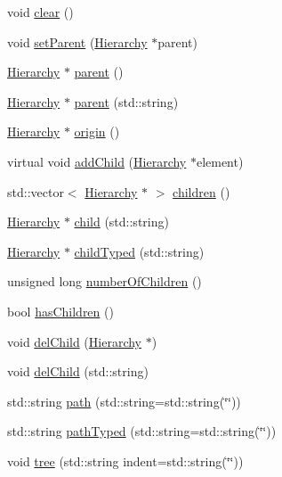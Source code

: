 \begin{DoxyCompactItemize}
void \hyperlink{classHierarchy_af4d43b0765b402670eed2d62c73405af}{clear} ()
\item 
void \hyperlink{classHierarchy_a585ad1aeec16077a0e532ab8b4fc557b}{setParent} (\hyperlink{classHierarchy}{Hierarchy} $\ast$parent)
\item 
\hyperlink{classHierarchy}{Hierarchy} $\ast$ \hyperlink{classHierarchy_a1c7bec8257e717f9c1465e06ebf845fc}{parent} ()
\item 
\hyperlink{classHierarchy}{Hierarchy} $\ast$ \hyperlink{classHierarchy_ad550588733bf75ac5c0fcfd7c8fd11a6}{parent} (std::string)
\item 
\hyperlink{classHierarchy}{Hierarchy} $\ast$ \hyperlink{classHierarchy_aee461dc930ce3871636ff87f075b1b83}{origin} ()
\item 
virtual void \hyperlink{classHierarchy_ad677774ff38fcb257c04a3a10d471fac}{addChild} (\hyperlink{classHierarchy}{Hierarchy} $\ast$element)
\item 
std::vector$<$ \hyperlink{classHierarchy}{Hierarchy} $\ast$ $>$ \hyperlink{classHierarchy_aa9a76f69e98e052ee1a6e32cea006288}{children} ()
\item 
\hyperlink{classHierarchy}{Hierarchy} $\ast$ \hyperlink{classHierarchy_a1e207f973c694b538bf90107b4868817}{child} (std::string)
\item 
\hyperlink{classHierarchy}{Hierarchy} $\ast$ \hyperlink{classHierarchy_a0c15a5276a3b80b4354d6bd8a01e0708}{childTyped} (std::string)
\item 
unsigned long \hyperlink{classHierarchy_ab16e84de65fd84e14001a6cf941c8be4}{numberOfChildren} ()
\item 
bool \hyperlink{classHierarchy_a255174fe4d316d2a3f430dcb9dab29f1}{hasChildren} ()
\item 
void \hyperlink{classHierarchy_a2b2b359fac003233f65786a616766bde}{delChild} (\hyperlink{classHierarchy}{Hierarchy} $\ast$)
\item 
void \hyperlink{classHierarchy_a1928ac7615fe0b5e55cd707f70dc6781}{delChild} (std::string)
\item 
std::string \hyperlink{classHierarchy_aa7990fa7caf132d83e361ce033c6c65a}{path} (std::string=std::string(\char`\"{}\char`\"{}))
\item 
std::string \hyperlink{classHierarchy_a1efd56cd164d328d2002e53a10a19b8c}{pathTyped} (std::string=std::string(\char`\"{}\char`\"{}))
\item 
void \hyperlink{classHierarchy_a76e914b9a677a22a82deb74d892bf261}{tree} (std::string indent=std::string(\char`\"{}\char`\"{}))
\item 

\end{DoxyCompactItemize}
